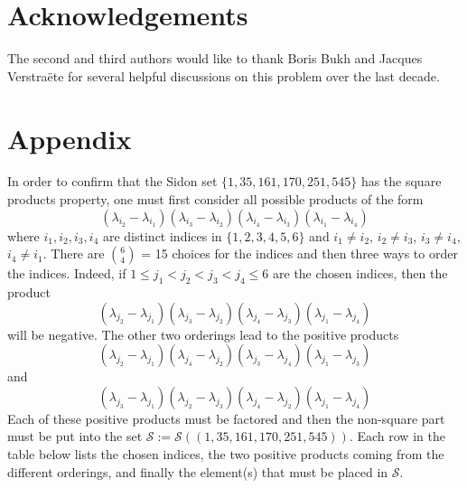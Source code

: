 \documentclass[12pt]{article}%
\def\mike#1{\noindent
\textcolor{green}
{\textsc{(Mike:}
\textsf{#1})}}
\begin{document}
 \section*{Acknowledgements}
The second and third authors would like to thank Boris Bukh and Jacques Verstra\"ete for several helpful discussions on this problem over the last decade. 




	
 
\section{Appendix} 

In order to confirm that the Sidon set $\{1,35,161,170,251,545 \}$ has the square products property, one must first consider all possible products of the form 
\[
( \lambda_{i_2} - \lambda_{i_1} ) ( \lambda_{i_3}  - \lambda_{i_2} ) ( \lambda_{i_4} - \lambda_{i_3} ) ( \lambda_{i_1} - \lambda_{i_4} )
\]
where $i_1,i_2,i_3,i_4$ are distinct indices in $\{1,2,3,4,5,6\}$ and $i_1 \neq i_2$, $i_2 \neq i_3$, $i_3 \neq i_4$, $i_4 \neq i_1$.  There are $\binom{6}{4}$ = 15 choices for the indices and then three ways to order the indices.  Indeed, if $1 \leq j_1 < j_2 < j_3 < j_4 \leq 6$ are the chosen indices, then the product 
\[
( \lambda_{j_2} - \lambda_{j_1} ) ( \lambda_{j_3}  - \lambda_{j_2} ) ( \lambda_{j_4} - \lambda_{j_3} ) ( \lambda_{j_1} - \lambda_{j_4} )
\]
will be negative.  The other two orderings lead to the positive products
\[
( \lambda_{j_2} - \lambda_{j_1} ) ( \lambda_{j_4}  - \lambda_{j_2} ) ( \lambda_{j_3} - \lambda_{j_4} ) ( \lambda_{j_1} - \lambda_{j_3} )
\]
and
\[
( \lambda_{j_3} - \lambda_{j_1} ) ( \lambda_{j_2}  - \lambda_{j_3} ) ( \lambda_{j_4} - \lambda_{j_2} ) ( \lambda_{j_1} - \lambda_{j_4} )
\]
Each of these positive products must be factored and then the non-square part must be put into the set $\mathcal{S}:=\mathcal{S}( ( 1,35,161,170,251,545 ) )$.  Each row in the table below lists the chosen indices, the two positive products coming from the different orderings, and finally the element(s) that must be placed in $\mathcal{S}$.   
\end{document}
